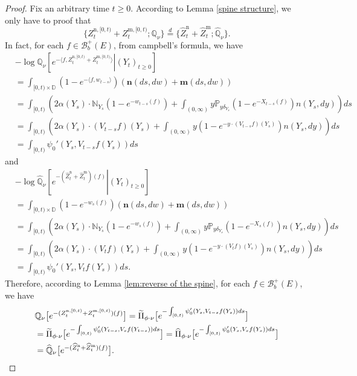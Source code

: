 \documentclass[12pt,a4paper]{amsart}
\numberwithin{equation}{section}
\theoremstyle{plain}
\theoremstyle{definition}
\theoremstyle{remark}
\begin{document}
\begin{proof}
	Fix an arbitrary time $t\geq 0$. According to Lemma \ref{spine structure}, we only have to proof that
\[
	\{Z^{\mathrm n,[0,t)}_{t} + Z^{\mathrm m,[0,t)}_{t}; \mathbb Q_\nu\}
	\overset{d}{=}
	\{\widehat Z^{\mathrm n}_{t} + \widehat Z^{\mathrm m}_{t}; \widehat{\mathbb Q}_\nu\}.
\]
	In fact, for each $f\in \mathcal B_b^+(E)$, from campbell's formula, we have
\begin{align}
	&-\log \mathbb Q_\nu \left [\left. e^{-\langle f, Z^{\mathrm n,[0,t)}_{t} + Z^{\mathrm m,[0,t)}_{t}\rangle}\right |(Y_t)_{t\geq 0}\right]
	\\&= \int_{[0,t)\times \mathbb D} \left(1-e^{- \langle f, w_{t-s}\rangle}\right)\left(\mathbf n(ds,dw) + \mathbf m(ds,dw)\right)
	\\&= \int_{[0,t)} \left(2\alpha(Y_s) \cdot \mathbb N_{Y_s}\left(1-e^{-w_{t-s}(f)}\right) + \int_{(0,\infty)} y \mathbb P_{y\delta_{Y_s}}\left(1-e^{-X_{t-s}(f)}\right)n(Y_s,dy)\right) ds
	\\&= \int_{[0,t)} \left(2\alpha(Y_s) \cdot (V_{t-s}f)(Y_s) + \int_{(0,\infty)} y \left(1-e^{-y\cdot(V_{t-s}f)(Y_s)}\right)n(Y_s,dy)\right) ds
	\\&= \int_{[0,t)} \psi_0'\left( Y_s, V_{t-s}f(Y_s)\right)ds
\end{align}
	and
\begin{align}
	&-\log \widehat{\mathbb Q}_\nu \left [\left. e^{-(\widehat Z^{\mathrm n}_{t} + \widehat Z^{\mathrm m}_{t})(f)}\right |(Y_t)_{t\geq 0}\right]
	\\&= \int_{[0,t)\times \mathbb D} \left(1-e^{- w_s(f)}\right)\left(\mathbf n(ds,dw) + \mathbf m(ds,dw)\right)
	\\&= \int_{[0,t)} \left(2\alpha(Y_s) \cdot \mathbb N_{Y_s}\left(1-e^{-w_{s}(f)}\right) + \int_{(0,\infty)} y \mathbb P_{y\delta_{Y_s}}\left(1-e^{-X_{s}(f)}\right)n(Y_s,dy)\right) ds
	\\&= \int_{[0,t)} \left(2\alpha(Y_s) \cdot (V_{t}f)(Y_s) + \int_{(0,\infty)} y \left(1-e^{-y\cdot(V_{t}f)(Y_s)}\right)n(Y_s,dy)\right) ds
	\\&= \int_{[0,t)} \psi_0'\left( Y_s, V_{t}f(Y_s)\right)ds.
\end{align}
	Therefore, according to Lemma \ref{lem:reverse of the spine}, for each $f\in \mathcal B_b^+(E)$, we have
\begin{align}
  	&\mathbb Q_\nu  \big[e^{-(Z^{\mathrm n,[0,t)}_{t} + Z^{\mathrm m,[0,t)}_{t})(f)}\big]
  	= \widetilde \Pi_{\phi\cdot\nu} \big[e^{-\int_{[0,t)} \psi_0'( Y_s, V_{t-s}f(Y_s))ds}\big]
  	\\&= \widetilde \Pi_{\phi\cdot\nu} \big[e^{-\int_{[0,t)} \psi_0'( Y_{t-s}, V_{s}f(Y_{t-s}))ds}\big]
  	= \widehat \Pi_{\phi\cdot\nu} \big[e^{-\int_{[0,t)} \psi_0'( Y_{s}, V_{s}f(Y_{s}))ds}\big]
  	\\&= \widehat{\mathbb Q}_\nu \big [e^{-(\widehat Z^{\mathrm n}_{t} + \widehat Z^{\mathrm m}_{t})(f)}\big].
  	\qedhere
\end{align}
\end{proof}
\end{document}
